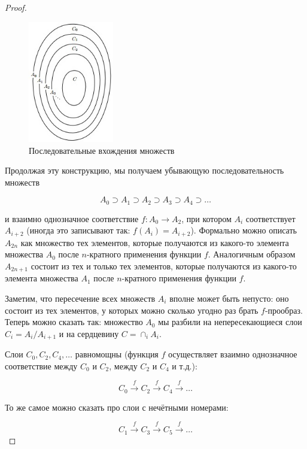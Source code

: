 \documentclass[a4paper, 12pt]{article}
\begin{document}
\begin{proof}
 \begin{figure}[h]
\begin{center}
\begin{minipage}[h]{0.4\linewidth}
 \includegraphics[height=5.3cm, width=\linewidth]{images/kantorbern2.jpg}
 \caption{Последовательные вхождения множеств}
 \end{minipage}
 \end{center}
 \end{figure}
 
 Продолжая эту конструкцию, мы получаем убывающую последовательность множеств
 
 \[A_0 \supset A_1 \supset A_2 \supset A_3 \supset A_4 \supset \ldots\]

 и взаимно однозначное соответствие $f : A_0 \rightarrow A_2$, при котором $A_i$ соответствует $A_{i + 2}$ (иногда это записывают так: $f(A_i) = A_{i+2}$). Формально можно описать $A_{2n}$ как множество тех элементов, которые получаются из какого-то элемента множества $A_0$ после $n$-кратного применения функции $f$. Аналогичным образом $A_{2n + 1}$ состоит из тех и только тех элементов, которые получаются из какого-то элемента множества $A_1$ после $n$-кратного применения функции $f$.
 
 Заметим, что пересечение всех множеств $A_i$ вполне может быть непусто: оно состоит из тех элементов, у которых можно сколько угодно раз брать $f$-прообраз. Теперь можно сказать так: множество $A_0$ мы разбили на непересекающиеся слои $C_i = A_i / A_{i+1}$ и на
сердцевину $C =\cap_i A_i$.

 Слои $C_0, C_2, C_4, \ldots$ равномощны (функция $f$ осуществляет взаимно однозначное соответствие между $C_0$ и $C_2$, между $C_2$ и $C_4$ и т.д.):

\[C_0 \xrightarrow{f} C_2 \xrightarrow{f} C_4 \xrightarrow{f} \ldots\]

То же самое можно сказать про слои с нечётными номерами:

\[C_1 \xrightarrow{f} C_3 \xrightarrow{f} C_5 \xrightarrow{f} \ldots\]


\end{proof}
\end{document}
